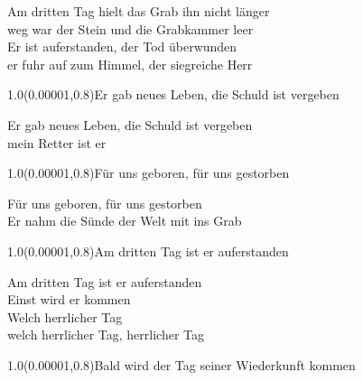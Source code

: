 \documentclass[aspectratio=169]{beamer}
\begin{document}
\begin{frame}
\centering
\color{white}
\huge{Am dritten Tag hielt das Grab ihn nicht länger} \\
\huge{weg war der Stein und die Grabkammer leer} \\
\huge{Er ist auferstanden, der Tod überwunden} \\
\huge{er fuhr auf zum Himmel, der siegreiche Herr} \\

\begin{textblock}{1.0}(0.00001,0.8)\color{gray}\normalsize{Er gab neues Leben, die Schuld ist vergeben}\end{textblock}
\end{frame}

\begin{frame}
\centering
\color{white}
\huge{Er gab neues Leben, die Schuld ist vergeben} \\
\huge{mein Retter ist er} \\

\begin{textblock}{1.0}(0.00001,0.8)\color{gray}\normalsize{Für uns geboren, für uns gestorben}\end{textblock}
\end{frame}

\begin{frame}
\centering
\color{white}
\huge{Für uns geboren, für uns gestorben} \\
\huge{Er nahm die Sünde der Welt mit ins Grab} \\

\begin{textblock}{1.0}(0.00001,0.8)\color{gray}\normalsize{Am dritten Tag ist er auferstanden}\end{textblock}
\end{frame}

\begin{frame}
\centering
\color{white}
\huge{Am dritten Tag ist er auferstanden} \\
\huge{Einst wird er kommen} \\
\huge{Welch herrlicher Tag} \\
\huge{welch herrlicher Tag, herrlicher Tag} \\

\begin{textblock}{1.0}(0.00001,0.8)\color{gray}\normalsize{Bald wird der Tag seiner Wiederkunft kommen}\end{textblock}
\end{frame}
\end{document}
